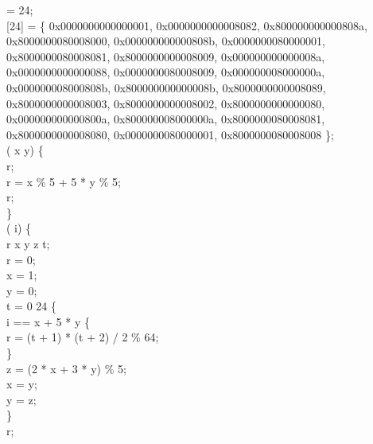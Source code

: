 %
   = 24;\\
[24]  = \{ 
0x0000000000000001, 0x0000000000008082, 0x800000000000808a,
0x8000000080008000, 0x000000000000808b, 0x0000000080000001,
0x8000000080008081, 0x8000000000008009, 0x000000000000008a,
0x0000000000000088, 0x0000000080008009, 0x000000008000000a,
0x000000008000808b, 0x800000000000008b, 0x8000000000008089,
0x8000000000008003, 0x8000000000008002, 0x8000000000000080,
0x000000000000800a, 0x800000008000000a, 0x8000000080008081,
0x8000000000008080, 0x0000000080000001, 0x8000000080008008 \};\\
  (  x y) \jasminarrow{}   \{\\
  r;\\
r = x \% 5 + 5 * y \% 5;\\
 r;\\
\}\\
  (  i) \jasminarrow{}   \{\\
  r x y z t;\\
r = 0;\\
x = 1;\\
y = 0;\\
 t = 0  24 \{\\
 i == x + 5 * y \{\\
r = (t + 1) * (t + 2) / 2 \% 64;\\
\}\\
z = (2 * x + 3 * y) \% 5;\\
x = y;\\
y = z;\\
\}\\
 r;\\
